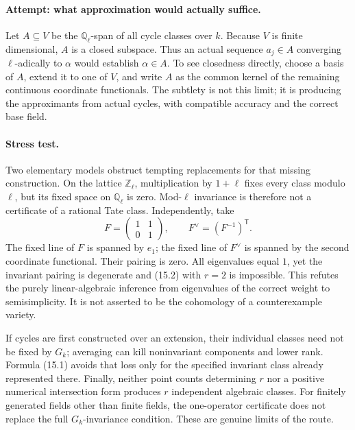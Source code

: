 \documentclass[11pt,a4paper]{article}
\newcommand{\Z}{\mathbb{Z}}
\newcommand{\Q}{\mathbb{Q}}
\begin{document}
\paragraph{Attempt: what approximation would actually suffice.}
Let $A\subseteq V$ be the $\Q_\ell$-span of all cycle classes over $k$.
Because $V$ is finite dimensional, $A$ is a closed subspace. Thus an
actual sequence $a_j\in A$ converging $\ell$-adically to $\alpha$ would
establish $\alpha\in A$. To see closedness directly, choose a basis of
$A$, extend it to one of $V$, and write $A$ as the common kernel of the
remaining continuous coordinate functionals. The subtlety is not this
limit; it is producing the approximants from actual cycles, with
compatible accuracy and the correct base field.

\paragraph{Stress test.}
Two elementary models obstruct tempting replacements for that missing
construction. On the lattice $\Z_\ell$, multiplication by $1+\ell$ fixes
every class modulo $\ell$, but its fixed space on $\Q_\ell$ is zero.
Mod-$\ell$ invariance is therefore not a certificate of a rational Tate
class. Independently, take
\[
 F=\begin{pmatrix}1&1\\0&1\end{pmatrix},\qquad
 F^\vee=(F^{-1})^{\mathsf T}.
\]
The fixed line of $F$ is spanned by $e_1$; the fixed line of $F^\vee$ is
spanned by the second coordinate functional. Their pairing is zero.
All eigenvalues equal $1$, yet the invariant pairing is degenerate and
(15.2) with $r=2$ is impossible. This refutes the purely linear-algebraic
inference from eigenvalues of the correct weight to semisimplicity. It
is not asserted to be the cohomology of a counterexample variety.

If cycles are first constructed over an extension, their individual
classes need not be fixed by $G_k$; averaging can kill noninvariant
components and lower rank. Formula (15.1) avoids that loss only for the
specified invariant class already represented there. Finally, neither
point counts determining $r$ nor a positive numerical intersection form
produces $r$ independent algebraic classes. For finitely generated fields
other than finite fields, the one-operator certificate does not replace
the full $G_k$-invariance condition. These are genuine limits of the route.
\end{document}

